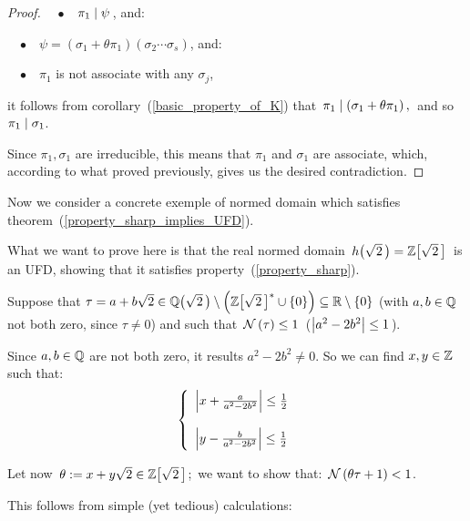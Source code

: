 \begin{proof}
~~$\bullet$~~\:$\pi_1 \mid \psi\,$,\; and:

\nopagebreak
~~$\bullet$~~\:$\psi = \left( \sigma_1 + \theta\pi_1 \right)
\left( \sigma_2\cdots\sigma_s  \right)$,\; and:

\nopagebreak
~~$\bullet$~~\:$\pi_1$ is not associate with any $\sigma_j$,

it follows from corollary~(\ref{basic_property_of_K}) that\,
$\pi_1 \mid \left( \sigma_1 + \theta\pi_1 \right),$\,
and so\, $\pi_1 \mid \sigma_1$.

Since $\pi_1,\sigma_1$ are irreducible, this means that
$\pi_1$ and $\sigma_1$ are associate, which, according to
what proved previously, gives us the desired contradiction.
%
\end{proof}
%
Now we consider a concrete exemple of normed domain which
satisfies theorem~(\ref{property_sharp_implies_UFD}).

What we want to prove here is that the real normed
domain\, \mbox{$\hh{2} = \ZZ{2}$}\, is an UFD, showing
that it satisfies property~(\ref{property_sharp}).

Suppose that $\tau = a + b\sqrt{2} \in
\QQ{2} \setminus \left( \ZZ{2}^\ast \cup \{0\} \right)
\subseteq \Rzero$
(with $a, b \in \mathbb{Q}$ not both zero, since $\tau \not= 0$)
and such that\, $\mathcal{N}\left(\tau\right) \leq 1$\,
(\ie $\left|a^2 - 2b^2\right| \leq 1$\,).

Since $a,b \in \mathbb{Q}$ are not both zero, it results $a^2 - 2b^2 \neq 0$.
So we can find $x,y \in \mathbb{Z}$ such that:
%
\begin{equation}\label{x_and_y_limits}
\left\{ \begin{array}{l}
   \left|x + \frac{a}{a^2 - 2b^2}\right| \leq \frac{1}{2}
   \\
   \\
   \left|y - \frac{b}{a^2 - 2b^2}\right| \leq \frac{1}{2}
\end{array}
\right.
\end{equation}

Let now\, $\theta:= x + y \sqrt{2} \in \ZZ{2}$;\,
we want to show that:\, $\mathcal{N}\left(\theta\tau + 1\right) < 1$.

This follows from simple (yet tedious) calculations:

